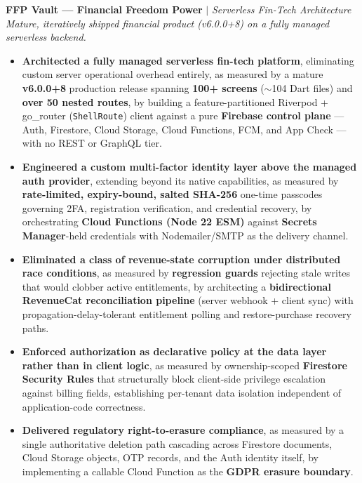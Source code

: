 \documentclass[10pt,letterpaper]{article}
\newenvironment{highlights}{
  \begin{itemize}[topsep=2pt,parsep=1pt,partopsep=0pt,itemsep=0pt,leftmargin=10pt]
}{\end{itemize}}
\begin{document}
\textbf{FFP Vault — Financial Freedom Power} $|$ \textit{Serverless Fin-Tech Architecture}
\hfill
\href{https://play.google.com/store/apps/details?id=com.ffpvault.app}{\textcolor{myblue}{\faGooglePlay}}
\href{https://github.com/H-Yeasin/assetmanagement}{\textcolor{myblue}{\faGithub}}\\
\textit{Mature, iteratively shipped financial product (v6.0.0+8) on a fully managed serverless backend.}
\begin{highlights}
  \item \textbf{Architected a fully managed serverless fin-tech platform}, eliminating custom server operational overhead entirely, as measured by a mature \textbf{v6.0.0+8} production release spanning \textbf{100+ screens} ($\sim$104 Dart files) and \textbf{over 50 nested routes}, by building a feature-partitioned Riverpod + go\_router (\texttt{ShellRoute}) client against a pure \textbf{Firebase control plane} — Auth, Firestore, Cloud Storage, Cloud Functions, FCM, and App Check — with no REST or GraphQL tier.
  \item \textbf{Engineered a custom multi-factor identity layer above the managed auth provider}, extending beyond its native capabilities, as measured by \textbf{rate-limited, expiry-bound, salted SHA-256} one-time passcodes governing 2FA, registration verification, and credential recovery, by orchestrating \textbf{Cloud Functions (Node 22 ESM)} against \textbf{Secrets Manager}-held credentials with Nodemailer/SMTP as the delivery channel.
  \item \textbf{Eliminated a class of revenue-state corruption under distributed race conditions}, as measured by \textbf{regression guards} rejecting stale writes that would clobber active entitlements, by architecting a \textbf{bidirectional RevenueCat reconciliation pipeline} (server webhook + client sync) with propagation-delay-tolerant entitlement polling and restore-purchase recovery paths.
  \item \textbf{Enforced authorization as declarative policy at the data layer rather than in client logic}, as measured by ownership-scoped \textbf{Firestore Security Rules} that structurally block client-side privilege escalation against billing fields, establishing per-tenant data isolation independent of application-code correctness.
  \item \textbf{Delivered regulatory right-to-erasure compliance}, as measured by a single authoritative deletion path cascading across Firestore documents, Cloud Storage objects, OTP records, and the Auth identity itself, by implementing a callable Cloud Function as the \textbf{GDPR erasure boundary}.

\end{highlights}
\end{document}
